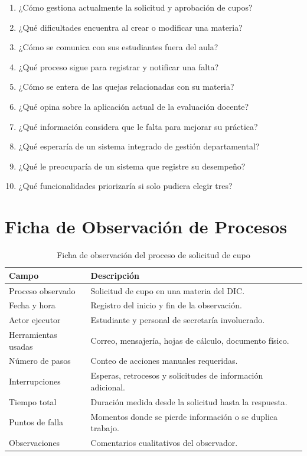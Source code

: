 \begin{enumerate}[leftmargin=1.4cm, itemsep=3pt]
  \item ¿Cómo gestiona actualmente la solicitud y aprobación de cupos?
  \item ¿Qué dificultades encuentra al crear o modificar una materia?
  \item ¿Cómo se comunica con sus estudiantes fuera del aula?
  \item ¿Qué proceso sigue para registrar y notificar una falta?
  \item ¿Cómo se entera de las quejas relacionadas con su materia?
  \item ¿Qué opina sobre la aplicación actual de la evaluación docente?
  \item ¿Qué información considera que le falta para mejorar su práctica?
  \item ¿Qué esperaría de un sistema integrado de gestión departamental?
  \item ¿Qué le preocuparía de un sistema que registre su desempeño?
  \item ¿Qué funcionalidades priorizaría si solo pudiera elegir tres?
\end{enumerate}

\section{Ficha de Observación de Procesos}

\begin{table}[H]
\centering
\caption{Ficha de observación del proceso de solicitud de cupo}
\label{tab:ficha-observacion}
\small
\begin{tabularx}{\textwidth}{@{}l X@{}}
\toprule
\rowcolor{verdeClaro}
\textbf{Campo} & \textbf{Descripción} \\
\midrule
Proceso observado & Solicitud de cupo en una materia del \ac{DIC}. \\
Fecha y hora & Registro del inicio y fin de la observación. \\
Actor ejecutor & Estudiante y personal de secretaría involucrado. \\
Herramientas usadas & Correo, mensajería, hojas de cálculo, documento físico. \\
Número de pasos & Conteo de acciones manuales requeridas. \\
Interrupciones & Esperas, retrocesos y solicitudes de información adicional. \\
Tiempo total & Duración medida desde la solicitud hasta la respuesta. \\
Puntos de falla & Momentos donde se pierde información o se duplica trabajo. \\
Observaciones & Comentarios cualitativos del observador. \\
\bottomrule
\end{tabularx}
\end{table}


